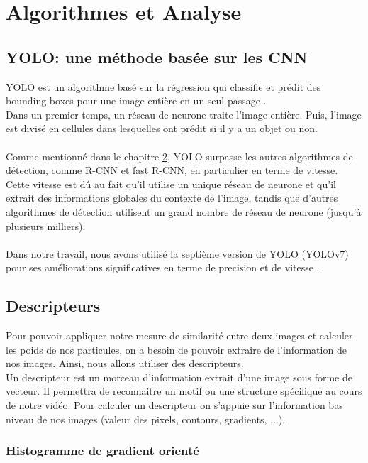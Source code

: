 \pagestyle{plain}
\chapter{Algorithmes et Analyse}


\section{YOLO: une méthode basée sur les CNN}
YOLO est un algorithme basé sur la régression qui classifie et prédit des bounding boxes pour une image entière en un seul passage \cite{redmon_you_2016}.\\
Dans un premier temps, un réseau de neurone traite l'image entière. Puis, l'image est divisé en cellules dans lesquelles ont prédit si il y a un objet ou non.\\
\\
Comme mentionné dans le chapitre \hyperlink{chapter.2}{2}, YOLO surpasse les autres algorithmes de détection, comme R-CNN et fast R-CNN, en particulier en terme de vitesse. Cette vitesse est dû au fait qu'il utilise un unique réseau de neurone et qu'il extrait des informations globales du contexte de l'image, tandis que d'autres algorithmes de détection utilisent un grand nombre de réseau de neurone (jusqu'à plusieurs milliers).\\
\\
Dans notre travail, nous avons utilisé la septième version de YOLO (YOLOv7) pour ses améliorations significatives en terme de precision et de vitesse \cite{wang_yolov7_nodate}.




\section{Descripteurs}
Pour pouvoir appliquer notre mesure de similarité entre deux images et calculer les poids de nos particules, on a besoin de pouvoir extraire de l'information de nos images. Ainsi, nous allons utiliser des descripteurs. \\
Un descripteur est un morceau d'information extrait d'une image sous forme de vecteur. Il permettra de reconnaitre un motif ou une structure spécifique au cours de notre vidéo. Pour calculer un descripteur on s'appuie sur l'information bas niveau de nos images (valeur des pixels, contours, gradients, ...).

\subsection{Histogramme de gradient orienté}

